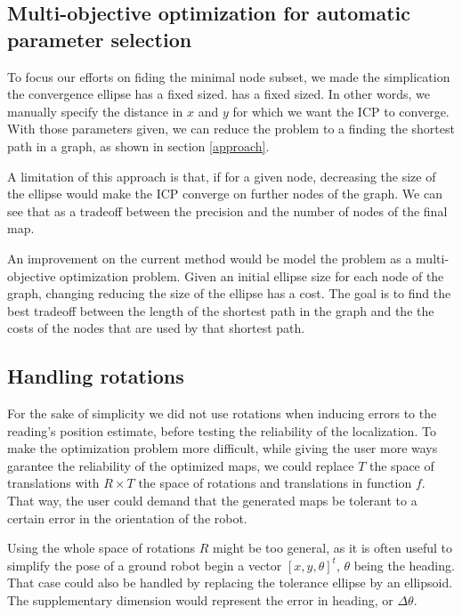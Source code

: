 \documentclass[letterpaper,10 pt,conference]{ieeeconf}
\begin{document}
\subsection{Multi-objective optimization for automatic parameter selection}

To focus our efforts on fiding the minimal node subset, we made the simplication the convergence ellipse has a fixed sized.
has a fixed sized.  In other words, we manually specify the distance in $x$ and $y$ for which we
want the ICP to converge. With those parameters given, we can reduce the problem to a finding the
shortest path in a graph, as shown in section \ref{approach}.


A limitation of this approach is that, if for a given node, decreasing the size of the ellipse would
make the ICP converge on further nodes of the graph. We can see that as a tradeoff between the
precision and the number of nodes of the final map.


An improvement on the current method would be model the problem as a multi-objective optimization
problem. Given an initial ellipse size for each node of the graph, changing reducing the size of the
ellipse has a cost. The goal is to find the best tradeoff between the length of the shortest path in
the graph and the the costs of the nodes that are used by that shortest path.

\subsection{Handling rotations}

For the sake of simplicity we did not use rotations when inducing errors to the reading's
position estimate, before testing the reliability of the localization. To make the optimization
problem more difficult, while giving the user more ways garantee the reliability of the optimized
maps, we could replace $T$ the space of translations with $R \times T$ the space of rotations and
translations in function $f$. That way, the user could demand that the generated maps be tolerant to
a certain error in the orientation of the robot.

Using the whole space of rotations $R$ might be too general, as it is often useful to simplify the pose of a
ground robot begin a vector $[x, y, \theta]^t$, $\theta$ being the heading. That case could also be
handled by replacing the tolerance ellipse by an ellipsoid. The supplementary dimension would
represent the error in heading, or $\Delta \theta$.
\end{document}
